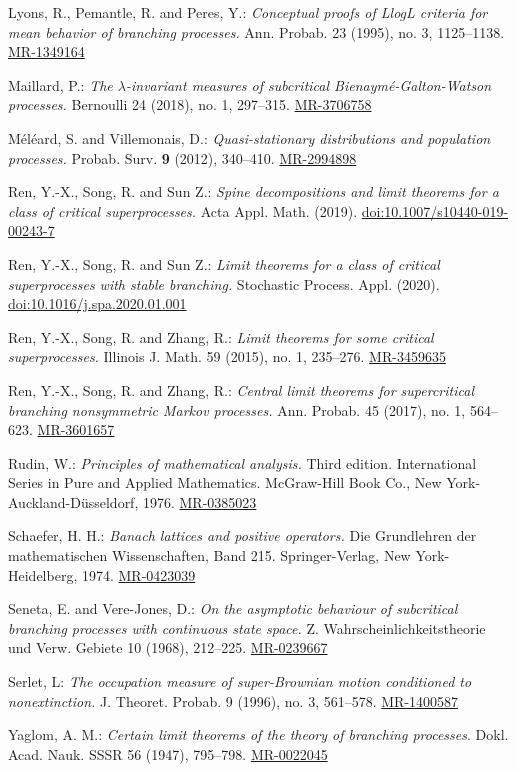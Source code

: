 \documentclass[12pt,a4paper]{amsart}
\numberwithin{equation}{section}
\theoremstyle{plain}
\theoremstyle{definition}
\theoremstyle{remark}
\def\MR#1{\href{http://www.ams.org/mathscinet-getitem?mr=#1}{MR-#1}}
\def\DOI#1{\href{https://doi.org/#1}{doi:#1}}
\begin{document}
\begin{thebibliography}{99}
	Lyons, R., Pemantle, R. and Peres, Y.:
	\emph{Conceptual proofs of LlogL criteria for mean behavior of branching processes.}
	Ann. Probab. 23 (1995), no. 3, 1125--1138.
	\MR{1349164}
	
	Maillard, P.:
	\emph{The $\lambda$-invariant measures of subcritical Bienaym\'e-Galton-Watson processes.}
	Bernoulli 24 (2018), no. 1, 297--315.
	\MR{3706758}

	M\'el\'eard, S. and Villemonais, D.:
	\emph{Quasi-stationary distributions and population processes.}
	Probab. Surv. \textbf{9} (2012),
	340--410.
	\MR{2994898}
	
	Ren, Y.-X., Song, R. and Sun Z.:
	\emph{Spine decompositions and limit theorems for a class of critical superprocesses.}
	Acta Appl. Math. (2019).
	\DOI{10.1007/s10440-019-00243-7}
	
	Ren, Y.-X., Song, R. and Sun Z.:
	\emph{Limit theorems for a class of critical superprocesses with stable branching.}
	Stochastic Process. Appl. (2020).
	\DOI{10.1016/j.spa.2020.01.001}

	Ren, Y.-X., Song, R. and Zhang, R.:
	\emph{Limit theorems for some critical superprocesses.}
	Illinois J. Math. 59 (2015), no. 1, 235--276.
	\MR{3459635}

	Ren, Y.-X., Song, R. and Zhang, R.:
	\emph{Central limit theorems for supercritical branching nonsymmetric Markov processes.}
	Ann. Probab. 45 (2017), no. 1, 564--623.
	\MR{3601657}
	
	Rudin, W.:
	\emph{Principles of mathematical analysis.}
	Third edition. International Series in Pure and Applied Mathematics. McGraw-Hill Book Co., New York-Auckland-D\"usseldorf, 1976.
	\MR{0385023}

	Schaefer, H. H.:
	\emph{Banach lattices and positive operators.}
	Die Grundlehren der mathematischen Wissenschaften, Band 215. Springer-Verlag, New York-Heidelberg, 1974.
	\MR{0423039}
	
	Seneta, E. and Vere-Jones, D.:
	\emph{On the asymptotic behaviour of subcritical branching processes with continuous state space.}
	Z. Wahrscheinlichkeitstheorie und Verw. Gebiete 10 (1968),
	212--225.
	\MR{0239667}
	
	Serlet, L:
	\emph{The occupation measure of super-Brownian motion conditioned to nonextinction.}
	J. Theoret. Probab. 9 (1996), no. 3, 561--578.
	\MR{1400587}

	Yaglom, A. M.: \emph{Certain limit theorems of the theory of branching processes}. Dokl. Acad.
	Nauk. SSSR 56 (1947), 795--798.
	\MR{0022045}

\end{thebibliography}
\end{document}
